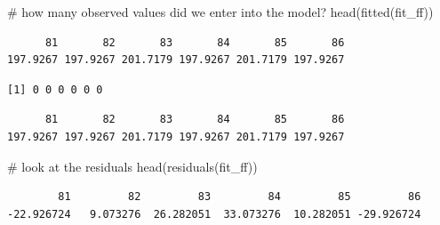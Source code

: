 \documentclass[
  letterpaper,
  DIV=11,
  numbers=noendperiod]{scrartcl}
\newenvironment{Shaded}{\begin{snugshade}}{\end{snugshade}}
\newcommand{\CommentTok}[1]{\textcolor[rgb]{0.37,0.37,0.37}{#1}}
\newcommand{\FunctionTok}[1]{\textcolor[rgb]{0.28,0.35,0.67}{#1}}
\newcommand{\NormalTok}[1]{\textcolor[rgb]{0.00,0.23,0.31}{#1}}
\newcommand{\SpecialCharTok}[1]{\textcolor[rgb]{0.37,0.37,0.37}{#1}}
\begin{document}
\begin{Shaded}
\begin{Highlighting}[]
\CommentTok{\# how many observed values did we enter into the model?}
\FunctionTok{head}\NormalTok{(}\FunctionTok{fitted}\NormalTok{(fit\_ff))}
\end{Highlighting}
\end{Shaded}

\begin{verbatim}
      81       82       83       84       85       86 
197.9267 197.9267 201.7179 197.9267 201.7179 197.9267 
\end{verbatim}

\begin{Shaded}
\end{Shaded}

\begin{verbatim}
[1] 0 0 0 0 0 0
\end{verbatim}

\begin{Shaded}
\end{Shaded}

\begin{verbatim}
      81       82       83       84       85       86 
197.9267 197.9267 201.7179 197.9267 201.7179 197.9267 
\end{verbatim}

\begin{Shaded}
\begin{Highlighting}[]
\CommentTok{\# look at the residuals}
\FunctionTok{head}\NormalTok{(}\FunctionTok{residuals}\NormalTok{(fit\_ff))}
\end{Highlighting}
\end{Shaded}

\begin{verbatim}
        81         82         83         84         85         86 
-22.926724   9.073276  26.282051  33.073276  10.282051 -29.926724 
\end{verbatim}
\end{document}
